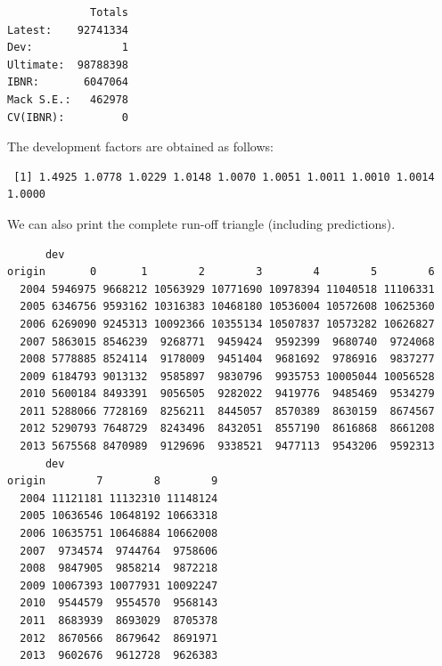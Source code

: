 \documentclass[]{book}
\newenvironment{Shaded}{\begin{snugshade}}{\end{snugshade}}
\newcommand{\KeywordTok}[1]{\textcolor[rgb]{0.13,0.29,0.53}{\textbf{#1}}}
\newcommand{\DataTypeTok}[1]{\textcolor[rgb]{0.13,0.29,0.53}{#1}}
\newcommand{\DecValTok}[1]{\textcolor[rgb]{0.00,0.00,0.81}{#1}}
\newcommand{\OperatorTok}[1]{\textcolor[rgb]{0.81,0.36,0.00}{\textbf{#1}}}
\newcommand{\NormalTok}[1]{#1}
\begin{document}
\begin{verbatim}
             Totals
Latest:    92741334
Dev:              1
Ultimate:  98788398
IBNR:       6047064
Mack S.E.:   462978
CV(IBNR):         0
\end{verbatim}

The development factors are obtained as follows:

\begin{Shaded}
\end{Shaded}

\begin{verbatim}
 [1] 1.4925 1.0778 1.0229 1.0148 1.0070 1.0051 1.0011 1.0010 1.0014 1.0000
\end{verbatim}

We can also print the complete run-off triangle (including predictions).

\begin{Shaded}
\end{Shaded}

\begin{verbatim}
      dev
origin       0       1        2        3        4        5        6
  2004 5946975 9668212 10563929 10771690 10978394 11040518 11106331
  2005 6346756 9593162 10316383 10468180 10536004 10572608 10625360
  2006 6269090 9245313 10092366 10355134 10507837 10573282 10626827
  2007 5863015 8546239  9268771  9459424  9592399  9680740  9724068
  2008 5778885 8524114  9178009  9451404  9681692  9786916  9837277
  2009 6184793 9013132  9585897  9830796  9935753 10005044 10056528
  2010 5600184 8493391  9056505  9282022  9419776  9485469  9534279
  2011 5288066 7728169  8256211  8445057  8570389  8630159  8674567
  2012 5290793 7648729  8243496  8432051  8557190  8616868  8661208
  2013 5675568 8470989  9129696  9338521  9477113  9543206  9592313
      dev
origin        7        8        9
  2004 11121181 11132310 11148124
  2005 10636546 10648192 10663318
  2006 10635751 10646884 10662008
  2007  9734574  9744764  9758606
  2008  9847905  9858214  9872218
  2009 10067393 10077931 10092247
  2010  9544579  9554570  9568143
  2011  8683939  8693029  8705378
  2012  8670566  8679642  8691971
  2013  9602676  9612728  9626383
\end{verbatim}
\end{document}
